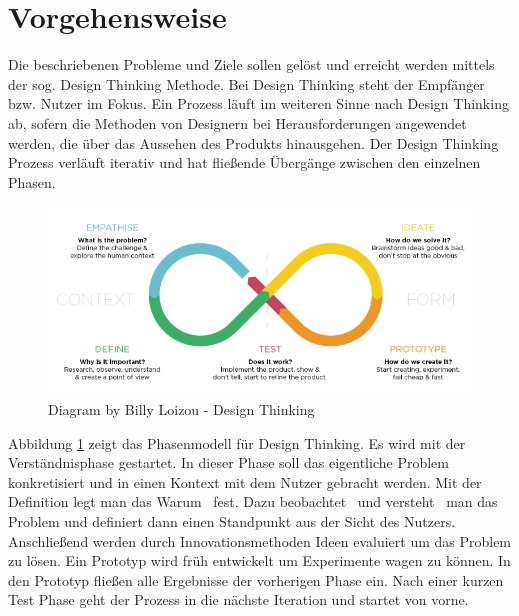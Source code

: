 \section{Vorgehensweise}
Die beschriebenen Probleme und Ziele sollen gelöst und erreicht werden mittels der sog. Design Thinking Methode. Bei Design Thinking steht der Empfänger bzw. Nutzer im Fokus. Ein Prozess läuft im weiteren Sinne nach Design Thinking ab, sofern die Methoden von Designern bei Herausforderungen angewendet werden, die über das Aussehen des Produkts hinausgehen.\cite[vgl.]{Patnaik2009} Der Design Thinking Prozess verläuft iterativ und hat fließende Übergänge zwischen den einzelnen Phasen.

\begin{figure}[h!]
	\centering
	\includegraphics[width=0.9\linewidth]{pictures/Diagram-by-Billy-Loizou-Design-Thinking-blog}
	\caption[Design Thinking Prozess]{Diagram by Billy Loizou - Design Thinking}
	\label{fig:diagram-by-billy-loizou-design-thinking-blog}
\end{figure}

Abbildung \ref{fig:diagram-by-billy-loizou-design-thinking-blog} zeigt das Phasenmodell für Design Thinking. Es wird mit der Verständnisphase gestartet. In dieser Phase soll das eigentliche Problem konkretisiert und in einen Kontext mit dem Nutzer gebracht werden. Mit der Definition legt man das \glqq Warum\grqq~ fest. Dazu \glqq beobachtet\grqq~ und \glqq versteht\grqq~ man das Problem und definiert dann einen Standpunkt aus der Sicht des Nutzers. Anschließend werden durch Innovationsmethoden Ideen evaluiert um das Problem zu lösen. Ein Prototyp wird früh entwickelt um Experimente wagen zu können. In den Prototyp fließen alle Ergebnisse der vorherigen Phase ein. Nach einer kurzen Test Phase geht der Prozess in die nächste Iteration und startet von vorne.\\

